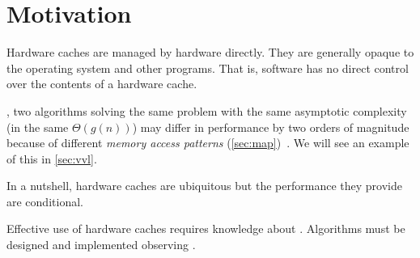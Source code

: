 \section{Motivation} %

Hardware caches are managed by hardware directly.  They are generally opaque to the
operating system and other programs.  That is, software has no direct control over the
contents of a hardware cache.

, two algorithms solving the same
problem with the same asymptotic complexity (in the same \(\Theta(g(n))\)) may differ in
performance by two orders of magnitude because of different \emph{memory access
patterns} (\cref{sec:map})~\cite{bigos}.  We will see an example of this in
\cref{sec:vvl}.

In a nutshell, hardware caches are ubiquitous but the performance  they provide are conditional.
\begin{comment}
   To use them effectively,
   algorithms must be designed and implemented with the architecture
   of hardware caches in mind.
\end{comment}
Effective use of hardware caches requires knowledge about .  Algorithms must be designed and implemented observing .


